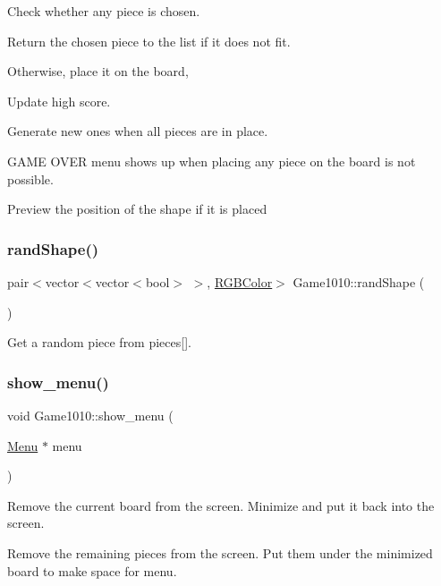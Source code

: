 Check whether any piece is chosen.

Return the chosen piece to the list if it does not fit.

Otherwise, place it on the board,

Update high score.

Generate new ones when all pieces are in place.

G\+A\+ME O\+V\+ER menu shows up when placing any piece on the board is not possible.

Preview the position of the shape if it is placed \mbox{\label{class_game1010_a9b86f7bf4ad3af111014ad33a781ffe5}} 
\subsubsection{\texorpdfstring{rand\+Shape()}{randShape()}}
{\footnotesize\ttfamily pair$<$vector$<$vector$<$bool$>$ $>$, \mbox{\hyperlink{class_r_g_b_color}{R\+G\+B\+Color}}$>$ Game1010\+::rand\+Shape (\begin{DoxyParamCaption}{ }\end{DoxyParamCaption})\hspace{0.3cm}{\ttfamily [inline]}}



Get a random piece from pieces\mbox{[}\mbox{]}. 

\mbox{\label{class_game1010_a99d6f53c3073861fe37ef67caa073840}} 
\subsubsection{\texorpdfstring{show\+\_\+menu()}{show\_menu()}}
{\footnotesize\ttfamily void Game1010\+::show\+\_\+menu (\begin{DoxyParamCaption}\item[{\mbox{\hyperlink{class_menu}{Menu}} $\ast$}]{menu }\end{DoxyParamCaption})\hspace{0.3cm}{\ttfamily [inline]}}

Remove the current board from the screen. Minimize and put it back into the screen.

Remove the remaining pieces from the screen. Put them under the minimized board to make space for menu.

